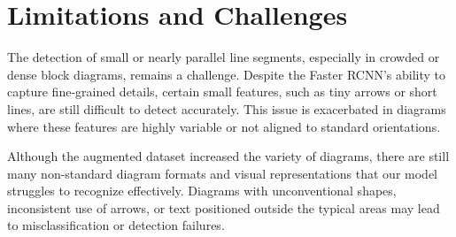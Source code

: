 \section{Limitations and Challenges}


The detection of small or nearly parallel line segments, especially in crowded or dense block diagrams, remains a challenge. Despite the Faster RCNN's ability to capture fine-grained details, certain small features, such as tiny arrows or short lines, are still difficult to detect accurately. This issue is exacerbated in diagrams where these features are highly variable or not aligned to standard orientations.

Although the augmented dataset increased the variety of diagrams, there are still many non-standard diagram formats and visual representations that our model struggles to recognize effectively. Diagrams with unconventional shapes, inconsistent use of arrows, or text positioned outside the typical areas may lead to misclassification or detection failures.
